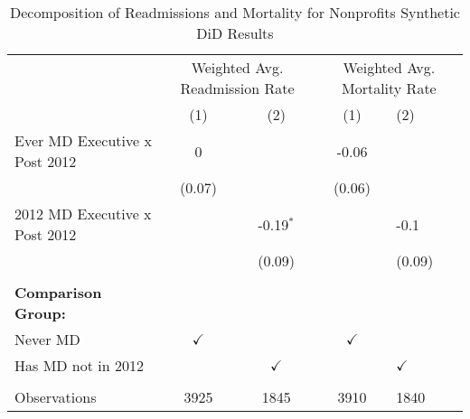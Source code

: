 \begin{table}[ht!]

\caption{\label{tab:MD_noMD_readmort_decomp_synth}Decomposition of Readmissions and Mortality for Nonprofits Synthetic DiD Results}
\centering
\begin{tabular}[t]{lcccl}
\toprule
\multicolumn{1}{c}{ } & \multicolumn{2}{c}{Weighted Avg. Readmission Rate} & \multicolumn{2}{c}{Weighted Avg. Mortality Rate} \\
\cmidrule(l{3pt}r{3pt}){2-3} \cmidrule(l{3pt}r{3pt}){4-5}
 & (1) & (2) & (1) & (2)\\
\midrule
Ever MD Executive x Post 2012 & 0 &  & -0.06 & \\
 & (0.07) &  & (0.06) & \\
2012 MD Executive x Post 2012 &  & -0.19$^{*}$ &  & -0.1\\
 &  & (0.09) &  & (0.09)\\
 &  &  &  \vphantom{1} & \\
\addlinespace
\textbf{Comparison Group:} &  &  &  & \\
Never MD & $\checkmark$ &  & $\checkmark$ & \\
Has MD not in 2012 &  & $\checkmark$ &  & $\checkmark$\\
 &  &  &  & \\
Observations & 3925 & 1845 & 3910 & 1840\\
\bottomrule
\end{tabular}
\end{table}
